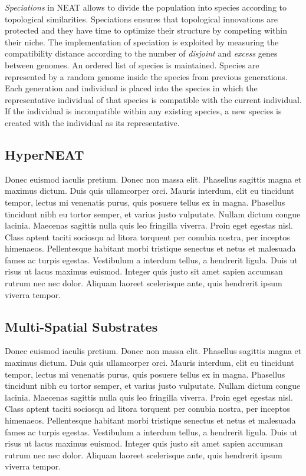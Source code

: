 \documentclass[format=acmsmall, review=false, screen=true]{acmart}
\begin{document}
\emph{Speciations} in NEAT allows to divide the population into species according to topological similarities. Speciations ensures that topological innovations are protected and they have time to optimize their structure by competing within their niche. The implementation of speciation is exploited by measuring the compatibility distance according to the number of \emph{disjoint} and \emph{excess} genes between genomes. An ordered list of species is maintained. Species are represented by a random genome inside the species from previous generations. Each generation and individual is placed into the species in which the representative individual of that species is compatible with the current individual. If the individual is incompatible within any existing species, a new species is created with the individual as its representative. 


\subsection{HyperNEAT}

Donec euismod iaculis pretium. Donec non massa elit. Phasellus sagittis magna et maximus dictum. Duis quis ullamcorper orci. Mauris interdum, elit eu tincidunt tempor, lectus mi venenatis purus, quis posuere tellus ex in magna. Phasellus tincidunt nibh eu tortor semper, et varius justo vulputate. Nullam dictum congue lacinia. Maecenas sagittis nulla quis leo fringilla viverra. Proin eget egestas nisl. Class aptent taciti sociosqu ad litora torquent per conubia nostra, per inceptos himenaeos. Pellentesque habitant morbi tristique senectus et netus et malesuada fames ac turpis egestas. Vestibulum a interdum tellus, a hendrerit ligula. Duis ut risus ut lacus maximus euismod. Integer quis justo sit amet sapien accumsan rutrum nec nec dolor. Aliquam laoreet scelerisque ante, quis hendrerit ipsum viverra tempor.

\subsection{Multi-Spatial Substrates}

Donec euismod iaculis pretium. Donec non massa elit. Phasellus sagittis magna et maximus dictum. Duis quis ullamcorper orci. Mauris interdum, elit eu tincidunt tempor, lectus mi venenatis purus, quis posuere tellus ex in magna. Phasellus tincidunt nibh eu tortor semper, et varius justo vulputate. Nullam dictum congue lacinia. Maecenas sagittis nulla quis leo fringilla viverra. Proin eget egestas nisl. Class aptent taciti sociosqu ad litora torquent per conubia nostra, per inceptos himenaeos. Pellentesque habitant morbi tristique senectus et netus et malesuada fames ac turpis egestas. Vestibulum a interdum tellus, a hendrerit ligula. Duis ut risus ut lacus maximus euismod. Integer quis justo sit amet sapien accumsan rutrum nec nec dolor. Aliquam laoreet scelerisque ante, quis hendrerit ipsum viverra tempor.
\end{document}
